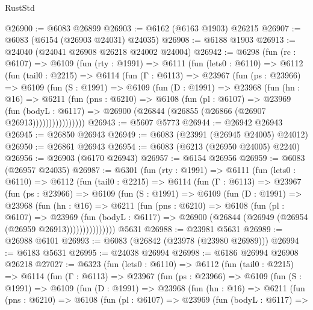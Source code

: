 \begin{lexlean}{RustStd}
\begin{coremodule}
@26900 := @6083 @26899
@26903 := @6162 (@6163 @1903) @26215
@26907 := @6083 (@6154 (@26903 @24031) @24035)
@26908 := @6188 @1903
@26913 := @24040 (@24041 @26908 @26218 @24002 @24004)
@26942 := @6298
    (fun (rc : @6107) =>
    @6109
      (fun (rty : @1991) =>
      @6111
        (fun (lets0 : @6110) =>
        @6112
          (fun (tail0 : @2215) =>
          @6114
            (fun (Γ : @6113) =>
            @23967
              (fun (ps : @23966) =>
              @6109
                (fun (S : @1991) =>
                @6109
                  (fun (D : @1991) =>
                  @23968
                    (fun (hn : @16) =>
                    @6211
                      (fun (pns : @6210) =>
                      @6108
                        (fun (pl : @6107) =>
                        @23969
                          (fun (bodyL : @6117) =>
                          @26900 (@26844 (@26855 (@26866 (@26907 @26913))))))))))))))))
@26943 := @5607 @5773
@26944 := @26942 @26943
@26945 := @26850 @26943
@26949 := @6083 (@23991 (@26945 @24005) @24012)
@26950 := @26861 @26943
@26954 := @6083 (@6213 (@26950 @24005) @2240)
@26956 := @26903 (@6170 @26943)
@26957 := @6154 @26956
@26959 := @6083 (@26957 @24035)
@26987 := @6301
    (fun (rty : @1991) =>
    @6111
      (fun (lets0 : @6110) =>
      @6112
        (fun (tail0 : @2215) =>
        @6114
          (fun (Γ : @6113) =>
          @23967
            (fun (ps : @23966) =>
            @6109
              (fun (S : @1991) =>
              @6109
                (fun (D : @1991) =>
                @23968
                  (fun (hn : @16) =>
                  @6211
                    (fun (pns : @6210) =>
                    @6108
                      (fun (pl : @6107) =>
                      @23969
                        (fun (bodyL : @6117) =>
                        @26900 (@26844 (@26949 (@26954 (@26959 @26913)))))))))))))))
    @5631
@26988 := @23981 @5631
@26989 := @26988 @6101
@26993 := @6083 (@26842 (@23978 (@23980 @26989)))
@26994 := @6183 @5631
@26995 := @24038 @26994
@26998 := @6186 @26994 @26908 @26218
@27027 := @6323
    (fun (lets0 : @6110) =>
    @6112
      (fun (tail0 : @2215) =>
      @6114
        (fun (Γ : @6113) =>
        @23967
          (fun (ps : @23966) =>
          @6109
            (fun (S : @1991) =>
            @6109
              (fun (D : @1991) =>
              @23968
                (fun (hn : @16) =>
                @6211
                  (fun (pns : @6210) =>
                  @6108
                    (fun (pl : @6107) =>
                    @23969
                      (fun (bodyL : @6117) =>

\end{coremodule}
\end{lexlean}
